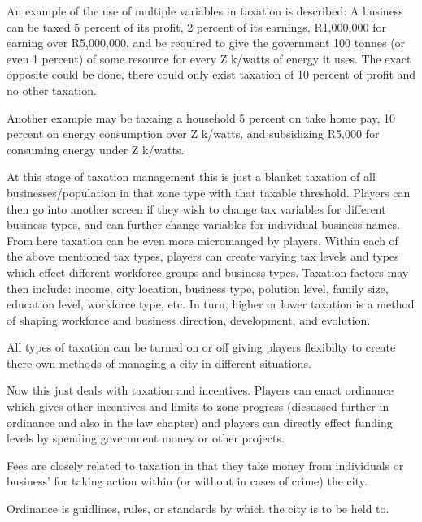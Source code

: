 An example of the use of multiple variables in taxation is described:
A business can be taxed 5 percent of its profit, 2 percent of its earnings, R1,000,000 for earning over R5,000,000, and be required to give the government 100 tonnes (or even 1 percent) of some resource for every Z k/watts of energy it uses. The exact opposite could be done, there could only exist taxation of 10 percent of profit and no other taxation. 

Another example may be taxaing a household 5 percent on take home pay, 10 percent on energy consumption over Z k/watts, and subsidizing R5,000 for consuming energy under Z k/watts.


At this stage of taxation management this is just a blanket taxation of all businesses/population in that zone type with that taxable threshold. Players can then go into another screen if they wish to change tax variables for different business types, and can further change variables for individual business names. From here taxation can be even more micromanged by players. Within each of the above mentioned tax types, players can create varying tax levels and types which effect different workforce groups and business types. Taxation factors may then include: income, city location, business type, polution level, family size, education level, workforce type, etc. In turn, higher or lower taxation is a method of shaping workforce and business direction, development, and evolution. 

All types of taxation can be turned on or off giving players flexibilty to create there own methods of managing a city in different situations.

Now this just deals with taxation and incentives. Players can enact ordinance which gives other incentives and limits to zone progress (dicsussed further in ordinance and also in the law chapter) and players can directly effect funding levels by spending government money or other projects. 







Fees are closely related to taxation in that they take money from individuals or business' for taking action within (or without in cases of crime) the city. 

Ordinance is guidlines, rules, or standards by which the city is to be held to.

